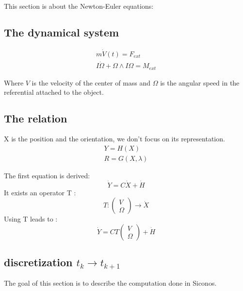 This section is about the Newton-Euler equations:

\subsection{The dynamical system}

\begin{equation}
\label{NE_Dyn1}
\begin{array}{l}
m \dot{V}(t) = F_{ext}  \\
I \dot \Omega +\Omega \wedge I\Omega = M_{ext}
\end{array}
\end{equation}

Where $V$ is the velocity of the center of mass and $\Omega$ is the angular speed in the
referential attached to the object.

\subsection{The relation}
X is the position and the orientation, we don't focus on its representation.
\begin{equation}
\label{Relation}
\begin{array}{l}
Y=H(X)  \\
R=G(X,\lambda)
\end{array}
\end{equation}


The first equation is derived:
\[\dot Y = C \dot X + \dot H\]
It exists an operator T :
\[T:  \left(\begin{array}{l} V\\ \Omega\end{array}\right) \to \dot X \]
  Using T leads to :
\[\dot Y = C T \left(\begin{array}{l} V\\ \Omega\end{array}\right) + \dot H\]

\subsection{discretization $t_k \to t_{k+1}$}
The goal of this section is to describe the computation done in Siconos.
